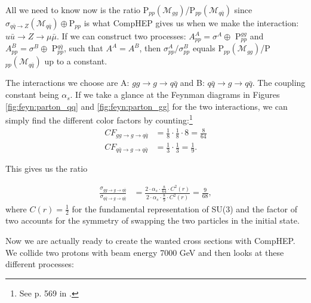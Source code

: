 All we need to know now is the ratio P$_{pp}(\mathcal{M}_{gg})$/P$_{pp}(\mathcal{M}_{q \bar q})$ since $ \sigma_{q \bar q\rightarrow Z}(\mathcal{M}_{q \bar q}) \oplus \textrm{P}_{pp}$ is what CompHEP gives us when we make the interaction: $u \bar u \rightarrow Z \rightarrow \mu \bar \mu $. If we can construct two processes: $A_{pp}^{A}=\sigma^{A} \oplus$ P$_{pp}^{gg}$ and $A_{pp}^{B}=\sigma^{B} \oplus$ P$_{pp}^{q \bar q}$, such that $A^{A}=A^{B}$, then $\sigma_{pp}^{A}/\sigma_{pp}^{B}$ equals  P$_{pp}(\mathcal{M}_{gg})$/P$_{pp}(\mathcal{M}_{q \bar q})$ up to a constant.

The interactions we choose are A: $gg \rightarrow g \rightarrow q \bar q$ and B: $q \bar q \rightarrow g \rightarrow q \bar q$. The coupling constant being $\alpha_{s}$. If we take a glance at the Feynman diagrams in Figures \ref{fig:feyn:parton_qq} and \ref{fig:feyn:parton_gg} for the two interactions, we can simply find the different color factors by counting:\footnote{See p. 569 in  \cite{peskin1993iqf}.}
\begin{align}
	CF_{gg \rightarrow g \rightarrow q \bar q}&=\frac{1}{8} \cdot \frac{1}{8} \cdot 8=\frac{8}{64}\\
	CF_{q \bar q \rightarrow g \rightarrow q \bar q}&=\frac{1}{3} \cdot \frac{1}{3}=\frac{1}{9}.
\end{align}

This gives us the ratio

\begin{align}
	\frac{\sigma_{gg \rightarrow g \rightarrow q \bar q}}{\sigma_{q \bar q \rightarrow g \rightarrow q \bar q}} &=\frac{2 \cdot \alpha_{s} \cdot \frac{8}{64} \cdot C^{2}(r)}{2 \cdot \alpha_{s} \cdot \frac{8}{9} \cdot C^{2}(r)}=\frac{9}{68},
\end{align}
where $C(r) = \frac{1}{2}$ for the fundamental representation of SU(3) and the factor of two accounts for the symmetry of swapping the two particles in the initial state.

Now we are actually ready to create the wanted cross sections with CompHEP. We collide two protons with beam energy 7000 GeV and then looks at these different processes:

